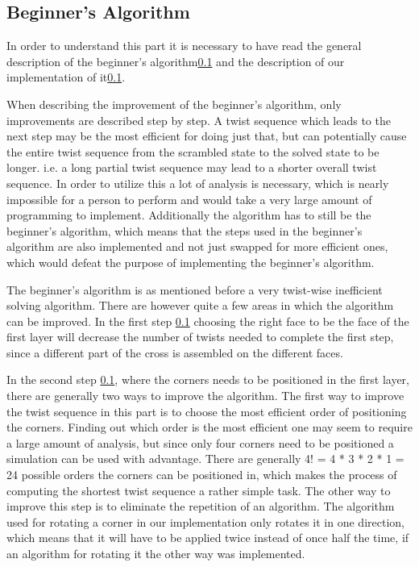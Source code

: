 

\subsection{Beginner's Algorithm} %
In order to understand this part it is necessary to have read the general description of the beginner's algorithm\ref{} and the description of our implementation of it\ref{}. 

When describing the improvement of the beginner's algorithm, only improvements are described step by step. 
A twist sequence which leads to the next step may be the most efficient for doing just that, but can potentially cause the entire twist sequence from the scrambled state to the solved state to be longer. 
i.e. a long partial twist sequence may lead to a shorter overall twist sequence. In order to utilize this a lot of analysis is necessary, which is nearly impossible for a person to perform and would take a very large amount of programming to implement.
Additionally the algorithm has to still be the beginner's algorithm, which means that the steps used in the beginner's algorithm are also implemented and not just swapped for more efficient ones, which would defeat the purpose of implementing the beginner's algorithm.


The beginner's algorithm is as mentioned before a very twist-wise inefficient solving algorithm. 
There are however quite a few areas in which the algorithm can be improved.
In the first step \ref{} choosing the right face to be the face of the first layer will decrease the number of twists needed to complete the first step, since a different part of the cross is assembled on the different faces.

In the second step \ref{}, where the corners needs to be positioned in the first layer, there are generally two ways to improve the algorithm.
The first way to improve the twist sequence in this part is to choose the most efficient order of positioning the corners.
Finding out which order is the most efficient one may seem to require a large amount of analysis, but since only four corners need to be positioned a simulation can be used with advantage. %
There are generally 4! = 4 * 3 * 2 * 1 = 24 possible orders the corners can be positioned in, which makes the process of computing the shortest twist sequence a rather simple task. %
The other way to improve this step is to eliminate the repetition of an algorithm. The algorithm used for rotating a corner \cpiece{} in our implementation only rotates it in one direction, which means that it will have to be applied twice instead of once half the time, if an algorithm for rotating it the other way was implemented.

